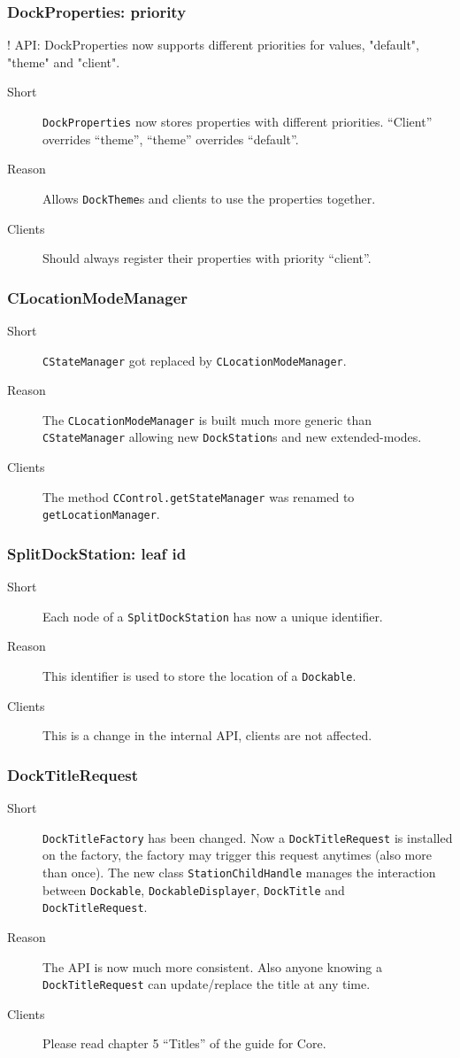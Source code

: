 \documentclass[a4paper,10pt]{article}
\newcommand{\src}[1]{\lstinline[basicstyle=\normalsize\ttfamily,keywordstyle=\normalsize\ttfamily,identifierstyle=\normalsize\ttfamily]|#1|}
\newcommand{\short}{\item[Short]}
\newcommand{\why}{\item[Reason]}
\newcommand{\clients}{\item[Clients]}
\begin{document}
\subsubsection{DockProperties: priority}
! API: DockProperties now supports different priorities for values, "default", "theme" and "client".
\begin{description}
 \short \src{DockProperties} now stores properties with different priorities. ``Client'' overrides ``theme'', ``theme'' overrides ``default''.
 \why Allows \src{DockTheme}s and clients to use the properties together.
 \clients Should always register their properties with priority ``client''.
\end{description}

\subsubsection{CLocationModeManager}
\begin{description}
 \short \src{CStateManager} got replaced by \src{CLocationModeManager}.
 \why The \src{CLocationModeManager} is built much more generic than \linebreak \src{CStateManager} allowing new \src{DockStation}s and new extended-modes.
 \clients The method \src{CControl.getStateManager} was renamed to \linebreak \src{getLocationManager}.
\end{description}

\subsubsection{SplitDockStation: leaf id}
\begin{description}
 \short Each node of a \src{SplitDockStation} has now a unique identifier.
 \why This identifier is used to store the location of a \src{Dockable}.
 \clients This is a change in the internal API, clients are not affected.
\end{description}

\subsubsection{DockTitleRequest}
\begin{description}
 \short \src{DockTitleFactory} has been changed. Now a \src{DockTitleRequest} is installed on the factory, the factory may trigger this request anytimes (also more than once). The new class \src{StationChildHandle} manages the interaction between \src{Dockable}, \src{DockableDisplayer}, \src{DockTitle} and \src{DockTitleRequest}.
 \why The API is now much more consistent. Also anyone knowing a \linebreak \src{DockTitleRequest} can update/replace the title at any time.
 \clients Please read chapter 5 ``Titles'' of the guide for Core.
\end{description}
\end{document}
